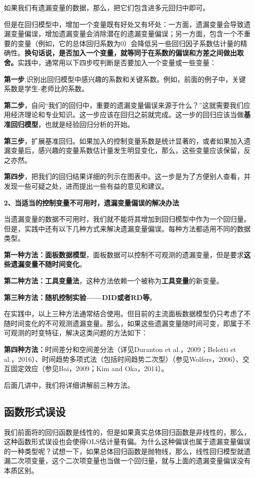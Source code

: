 \documentclass[cn,12pt,math=newtx,citestyle=gb7714-2015,bibstyle=gb7714-2015]{elegantbook}
\begin{document}
如果我们有遗漏变量的数据，那么，把它们包含进多元回归中即可。

但是在回归模型中，增加一个变量既有好处又有坏处：一方面，遗漏变量会导致遗漏变量偏误，增加遗漏变量会消除潜在的遗漏变量偏误；另一方面，包含一个不重要的变量（例如，它的总体回归系数为0）会降低另一些回归因子系数估计量的精确性。\textbf{换句话说，是否加入一个变量，就等同于在系数的偏误和方差之间做出取舍。}实践中，通常用以下四步哎判断是否要加入一个变量或一些变量：

\textbf{第一步},识别出回归模型中感兴趣的系数和关键系数。例如，前面的例子中，关键系数是学生-老师比的系数。

\textbf{第二步}，自问“我们的回归中，重要的遗漏变量偏误来源于什么？”这就需要我们应用经济理论和专业知识。这一步应该在回归之前就完成。这一步的回归应该当做\textbf{基准回归模型}，也就是经验回归分析的开始。

\textbf{第三步}，扩展基准回归。如果加入的控制变量系数是统计显著的，或者如果加入遗漏变量后，感兴趣的变量系数估计量发生明显变化，那么，这些变量应该保留，反之亦然。

\textbf{第四步}，把我们的回归结果详细的列示在图表中。这一步是为了方便别人查看，并发现一些可疑之处，进而提出一些有益的意见和建议。

\textbf{2、当适当的控制变量不可用时，遗漏变量偏误的解决办法}

当遗漏变量的数据不可用时，我们就不能将其增加到回归模型中作为一个回归量。但是，实践中还有以下几种方式来解决遗漏变量偏误。每种方法都适用不同的数据类型。

\textbf{第一种方法：面板数据模型}，面板数据可以控制不可观测的遗漏变量，但是要求\textbf{这些遗漏变量不随时间变化}。

\textbf{第二种方法：工具变量法}，这种方法依赖一个被称为\textbf{工具变量}的新变量。

\textbf{第三种方法：随机控制实验——DID或者RD等}。

在实践中，以上三种方法通常结合使用。但目前的主流面板数据模型仍只考虑了不随时间变化的不可观测遗漏变量。那么，如果这些遗漏变量随时间可变，即属于不可观测的时变特征，解决这类问题的方法如下：

\textbf{第四种方法：}时间差分和空间差分法（详见Duranton et al.，2009；Belotti et al.，2016）、时间趋势多项式法（包括时间趋势二次型）（参见Wolfers，2006）、交互固定效应（参见Bai，2009；Kim and Oka，2014）。

后面几讲中，我们将详细讲解前三种方法。

\subsection{函数形式误设}
我们前面将的回归函数是线性的，但是如果真实总体回归函数是非线性的，那么，这种函数形式误设也会使得OLS估计量有偏。为什么这种偏误也属于遗漏变量偏误的一种类型呢？试想一下，如果总体回归函数是抛物线，那么，线性回归模型就遗漏二次项变量，这个二次项变量也当做一个回归量，就与上面的遗漏变量偏误没有本质区别。
\end{document}
